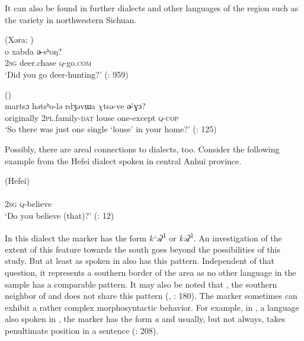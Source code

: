 It can also be found in further  dialects and other  languages of the region such as the  variety in northwestern Sichuan.

\ea%
    \label{ex:trans:45}
     (Xəra; )\\
    o  xabda \textbf{{ə}}{-s}{ʰ}{oŋ?}\\
    2\textsc{sg}  deer.chase  \textsc{q}-go.\textsc{com}\\
    \glt ‘Did you go deer-hunting?’ (\citealt{Sun1993}: 959)
    \z

\ea%
    \label{ex:trans:46}
      ()\\
    \gll martsɔ    həts{ʰ}o-lə    rdʒəvɯa  $\chi $tsə-ve \textbf{{ə}}\'{-ɣɔ?}\\
    originally  2\textsc{pl}.family-\textsc{dat}  louse    one-except  \textsc{q}-\textsc{cop}\\
    \glt ‘So there was just one single ‘louse’ in your home?’ (\citealt{Sun2006}: 125)
    \z

Possibly, there are areal connections to  dialects, too. Consider the following example from the Hefei dialect spoken in central Anhui province.

\ea%
    \label{ex:trans:47}
     (Hefei)\\
    \\
    2\textsc{sg}  \textsc{q-}believe\\
    \glt ‘Do you believe (that)?’ (\citealt{Zhu1985}: 12)
    \z

\noindent In this dialect the marker has the form \textit{k‘əʔ}\textsuperscript{1} or \textit{kəʔ}\textsuperscript{1}. An investigation of the extent of this feature towards the south goes beyond the possibilities of this study. But at least  as spoken in  also has this pattern. Independent of that question, it represents a southern border of the  area as no other language in the sample has a comparable pattern. It may also be noted that , the southern neighbor of  and  does not share this pattern (, \citealt{LaPollaHuang2003}: 180). The marker sometimes can exhibit a rather complex morphosyntactic behavior. For example, in , a language also spoken in , the marker has the form \textit{a} and usually, but not always, takes penultimate position in a sentence (\citealt{Ding2014}: 208).

